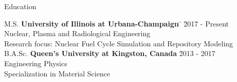 \documentclass{resume2} %
\begin{document}
\centering
\iffalse
I am an engineer that is passionate about \\ 
nuclear technology and developing innovative \\
systems to face today's energy challenges.   

Gwen is passionate about nuclear power and developing \\
innovative systems to improve nuclear energy and fuel cycle\\
technologies. She wants to contribute to pressing global\\
energy challenges and environmental sustainability. 
\fi

\raggedright

\begin{rSection}{Education}
	
\begin{tabbing}
M.S. \hspace*{2 em}\= \textbf{University of Illinois at Urbana-Champaign} \hspace*{5em} \= \hspace*{6em} \= 2017 - Present \\
\> Nuclear, Plasma and Radiological Engineering \\
\> Research focus: Nuclear Fuel Cycle Simulation and Repository Modeling\\
%
B.A.Sc. \hspace*{2 em}\> \textbf{Queen's University at Kingston, Canada} \> \hspace*{7.2em} \= 2013 - 2017 \\
\> Engineering Physics \\
\> Specialization in Material Science 
\end{tabbing}

\end{rSection}

\end{document}
